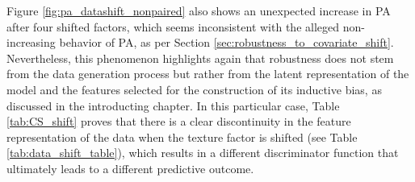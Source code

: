 Figure \ref{fig:pa_datashift_nonpaired} also shows an unexpected increase in PA after four 
shifted factors, which seems inconsistent with the alleged non-increasing behavior of PA, as per
Section \ref{sec:robustness_to_covariate_shift}. Nevertheless, this phenomenon 
highlights again that robustness does not stem from the data generation process but rather 
from the latent representation of the model and the features selected for the construction 
of its inductive bias, as discussed in the introducting chapter. In this particular case, 
Table \ref{tab:CS_shift} proves that
there is a clear discontinuity in the feature representation of the data when the texture
factor is shifted (see Table \ref{tab:data_shift_table}), which results in a different discriminator function that ultimately
leads to a different predictive outcome. \\


